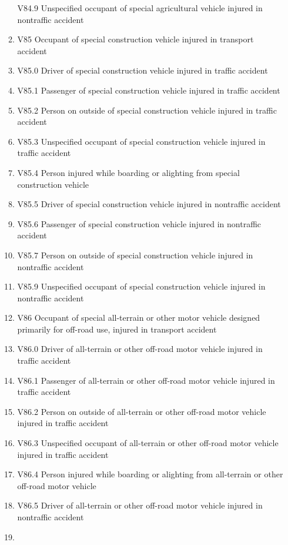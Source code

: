 \documentclass[
]{scrartcl}
\begin{document}
\begin{itemize}
\begin{enumerate}
    V84.9 Unspecified occupant of special agricultural vehicle injured
    in nontraffic accident
  \item
    V85 Occupant of special construction vehicle injured in transport
    accident
  \item
    V85.0 Driver of special construction vehicle injured in traffic
    accident
  \item
    V85.1 Passenger of special construction vehicle injured in traffic
    accident
  \item
    V85.2 Person on outside of special construction vehicle injured in
    traffic accident
  \item
    V85.3 Unspecified occupant of special construction vehicle injured
    in traffic accident
  \item
    V85.4 Person injured while boarding or alighting from special
    construction vehicle
  \item
    V85.5 Driver of special construction vehicle injured in nontraffic
    accident
  \item
    V85.6 Passenger of special construction vehicle injured in
    nontraffic accident
  \item
    V85.7 Person on outside of special construction vehicle injured in
    nontraffic accident
  \item
    V85.9 Unspecified occupant of special construction vehicle injured
    in nontraffic accident
  \item
    V86 Occupant of special all-terrain or other motor vehicle designed
    primarily for off-road use, injured in transport accident
  \item
    V86.0 Driver of all-terrain or other off-road motor vehicle injured
    in traffic accident
  \item
    V86.1 Passenger of all-terrain or other off-road motor vehicle
    injured in traffic accident
  \item
    V86.2 Person on outside of all-terrain or other off-road motor
    vehicle injured in traffic accident
  \item
    V86.3 Unspecified occupant of all-terrain or other off-road motor
    vehicle injured in traffic accident
  \item
    V86.4 Person injured while boarding or alighting from all-terrain or
    other off-road motor vehicle
  \item
    V86.5 Driver of all-terrain or other off-road motor vehicle injured
    in nontraffic accident
  \item

\end{enumerate}
\end{itemize}
\end{document}
